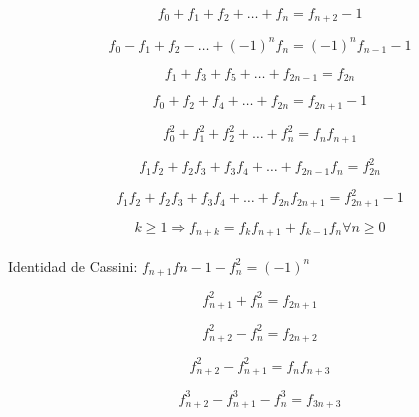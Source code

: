 \begin{equation*}
  f_0 + f_1 + f_2 + \dots + f_n = f_{n+2} -1
\end{equation*}

\begin{equation*}
  f_0 - f_1 + f_2 - \dots + (-1)^n f_n = (-1)^n f_{n-1} - 1
\end{equation*}

\begin{equation*}
  f_1 + f_3 + f_5 + \dots + f_{2n-1} = f_{2n}
\end{equation*}

\begin{equation*}
  f_0 + f_2 + f_4 + \dots + f_{2n} = f_{2n+1} - 1
\end{equation*}

\begin{equation*}
  f_0^2 + f_1^2 + f_2^2 + \dots + f_n^2 = f_n f_{n+1}
\end{equation*}

\begin{equation*}
  f_1 f_2 + f_2 f_3 + f_3 f_4 + \dots + f_{2n-1} f_n = f_{2n}^2
\end{equation*}

\begin{equation*}
  f_1 f_2 + f_2 f_3 + f_3 f_4 + \dots + f_{2n} f_{2n+1} = f_{2n+1}^2 - 1
\end{equation*}

\begin{equation*}
  k \ge 1 \Rightarrow f_{n+k} = f_k f_{n+1} + f_{k-1} f_n    \forall n \ge 0
\end{equation*}\\

Identidad de Cassini: $f_{n+1} f{n-1} - f_n^2 = (-1)^n$



\begin{equation*}
  f_{n+1}^2 + f_n^2 = f_{2n + 1}	
\end{equation*}

\begin{equation*}
  f_{n+2}^2 - f_n^2 = f_{2n + 2}
\end{equation*}

\begin{equation*}
  f_{n+2}^2 - f_{n+1}^2 = f_n f_{n + 3}
\end{equation*}

\begin{equation*}
  f_{n+2}^3 - f_{n+1}^3 - f_n^3 = f_{3n + 3}
\end{equation*}

